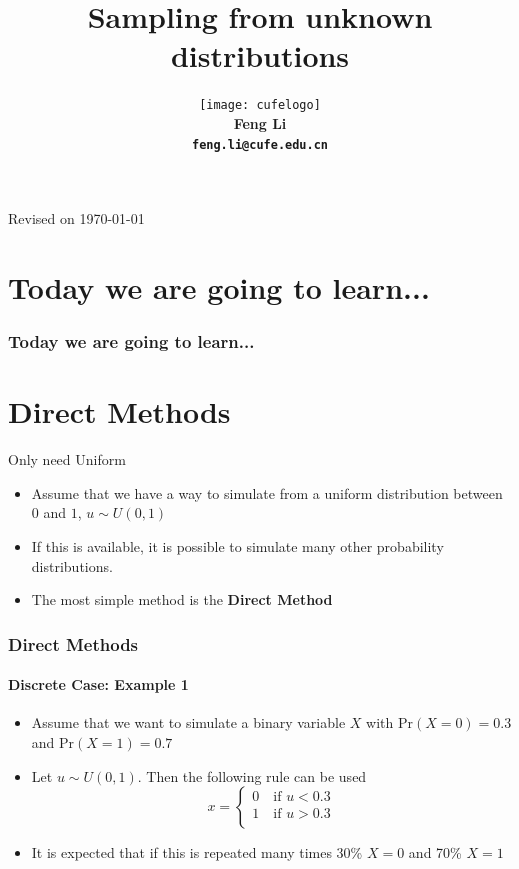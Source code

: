 \documentclass[10pt]{beamer}
\title[Statistical Computing]{{\textbf{Sampling from unknown distributions}}}
\author[Feng Li]{\texttt{[image: cufelogo]}\\
  \vspace{0.5cm}\textbf{Feng Li\\\texttt{feng.li@cufe.edu.cn}}}
\institute[SAM.CUFE.EDU.CN]{\footnotesize{\textbf{School of
      Statistics and Mathematics\\ Central University of Finance and
      Economics}}}
\date{}
\begin{document}
\begin{frame}[plain]
  \titlepage
  \tiny{Revised on \today}
\end{frame}


\section*{Today we are going to learn...}
\begin{frame}
  \frametitle{Today we are going to learn...}
  \tableofcontents
\end{frame}


\section{Direct Methods}

\begin{frame}{Only need Uniform}

  \begin{itemize}
  \item Assume that we have a way to simulate from a uniform distribution between $0$ and $1$, $u\sim U(0,1)$

  \item If this is available, it is possible to simulate many other probability distributions.

  \item The most simple method is the {\bf Direct Method}
  \end{itemize}
\end{frame}

\begin{frame}
  \frametitle{Direct Methods}
  \framesubtitle{Discrete Case: Example 1}
  \begin{itemize}
  \item Assume that we want to simulate a binary variable $X$ with $\mbox{Pr}(X=0)=0.3$ and $\mbox{Pr}(X=1)=0.7$

  \item Let $u\sim U(0,1)$.  Then the following rule can be used
    \begin{equation}
      x=\left\{\begin{array}{c}
                 0 \quad \mbox{if $u<0.3$}\\
                 1 \quad \mbox{if $u>0.3$}\\
               \end{array}
             \right.
           \end{equation}

         \item It is expected that if this is repeated many times 30\% $X=0$ and 70\% $X=1$
         \end{itemize}
       \end{frame}
\end{document}
